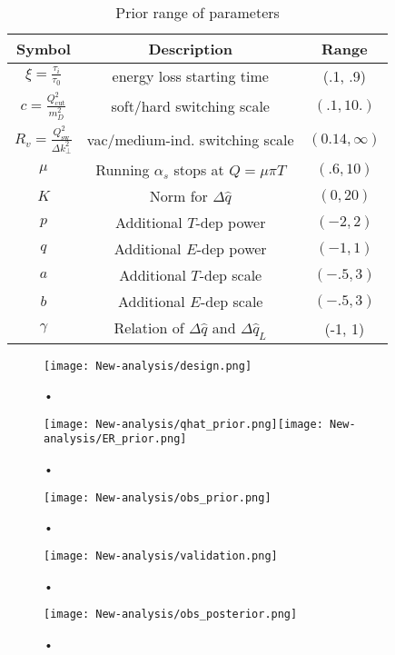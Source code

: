 \begin{table}
\centering
\caption{Prior range of parameters}\label{table:new:prior}
\begin{tabular}{ccc}
Symbol & Description & Range \\
\hline
$\xi = \frac{\tau_i}{\tau_0}$ & energy loss starting time & (.1, .9) \\
$c = \frac{Q_{\textrm{cut}}^2}{m_D^2}$ & soft/hard switching scale & $(.1, 10.)$ \\
$R_v = \frac{Q_{\textrm{sw}}^2}{\Delta k_\perp^2}$ & vac/medium-ind. switching scale & $(0.14, \infty)$\\
$\mu$ & Running $\alpha_s$ stops at $Q = \mu\pi T$ & $(.6, 10)$ \\
$K$ & Norm for $\Delta \hat{q}$ & $(0, 20)$\\ 
$p$ & Additional $T$-dep power  & $(-2, 2)$\\ 
$q$ & Additional $E$-dep power  & $(-1, 1)$\\ 
$a$ & Additional $T$-dep scale  & $(-.5, 3)$\\ 
$b$ & Additional $E$-dep scale  & $(-.5, 3)$\\ 
$\gamma$ & Relation of $\Delta \hat{q}$ and $\Delta \hat{q}_L$  & (-1, 1)\\ 
\end{tabular}
\end{table}

\begin{figure}
\centering
\texttt{[image: New-analysis/design.png]}
\caption{•}
\label{fig:new:design}
\end{figure}

\begin{figure}
\centering
\texttt{[image: New-analysis/qhat\_prior.png]}\texttt{[image: New-analysis/ER\_prior.png]}
\caption{•}
\label{fig:new:design-qhat}
\end{figure}

\begin{figure}
\centering
\texttt{[image: New-analysis/obs\_prior.png]}
\caption{•}
\label{fig:new:obs_prior}
\end{figure}


\begin{figure}
\centering
\texttt{[image: New-analysis/validation.png]}
\caption{•}
\label{fig:new:validation}
\end{figure}


\begin{figure}
\centering
\texttt{[image: New-analysis/obs\_posterior.png]}
\caption{•}
\label{fig:new:obs_posterior}
\end{figure}

